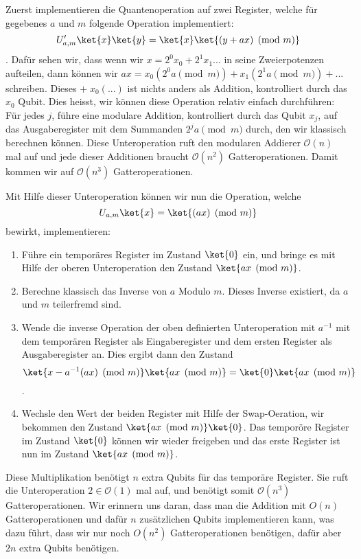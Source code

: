 Zuerst implementieren die Quantenoperation auf zwei Register, welche für gegebenes $a$ und $m$ folgende Operation implementiert: $$U'_{a, m}\ket{x}\ket{y} = \ket{x}\ket{(y + ax) \pmod{m}}$$.
Dafür sehen wir, dass wenn wir $x = 2^0 x_0 + 2^1 x_1 ...$ in seine Zweierpotenzen aufteilen, dann können wir $ax = x_0(2^0 a \pmod{m}) + x_1(2^1 a \pmod{m}) + ...$ schreiben. Dieses $+ \;x_0(...)$ ist nichts anders als Addition, kontrolliert durch das $x_0$ Qubit. Dies heisst, wir können diese Operation relativ einfach durchführen: \newline
Für jedes $j$, führe eine modulare Addition, kontrolliert durch das Qubit $x_j$, auf das Ausgaberegister mit dem Summanden $2^ja \pmod{m}$ durch, den wir klassisch berechnen können. \newline
Diese Unteroperation ruft den modularen Addierer $\mathcal O(n)$ mal auf und jede dieser Additionen braucht $\mathcal O(n^2)$ Gatteroperationen. Damit kommen wir auf $\mathcal O(n^3)$ Gatteroperationen.

Mit Hilfe dieser Unteroperation können wir nun die Operation, welche $$U_{a, m}\ket{x} = \ket{(ax) \pmod{m}}$$ bewirkt, implementieren:
\begin{enumerate}
    \item Führe ein temporäres Register im Zustand $\ket{0}$ ein, und bringe es mit Hilfe der oberen Unteroperation den Zustand $\ket{ax \pmod{m}}$.
    \item Berechne klassisch das Inverse von $a$ Modulo $m$. Dieses Inverse existiert, da $a$ und $m$ teilerfremd sind.
    \item Wende die inverse Operation der oben definierten Unteroperation mit $a^{-1}$ mit dem temporären Register als Eingaberegister und dem ersten Register als Ausgaberegister an. Dies ergibt dann den Zustand $$\ket{x - a^{-1}(ax) \pmod{m}}\ket{ax \pmod{m}} = \ket{0}\ket{ax \pmod{m}}$$.
    \item Wechsle den Wert der beiden Register mit Hilfe der Swap-Oeration, wir bekommen den Zustand $\ket{ax \pmod{m}}\ket{0}$. Das temporöre Register im Zustand $\ket{0}$ können wir wieder freigeben und das erste Register ist nun im Zustand $\ket{ax \pmod{m}}$.
\end{enumerate}
Diese Multiplikation benötigt $n$ extra Qubits für das temporäre Register. Sie ruft die Unteroperation $2 \in \mathcal O(1)$ mal auf, und benötigt somit $\mathcal O(n^3)$ Gatteroperationen. Wir erinnern uns daran, dass man die Addition mit $O(n)$ Gatteroperationen und dafür $n$ zusätzlichen Qubits implementieren kann, was dazu führt, dass wir nur noch $O(n^2)$ Gatteroperationen benötigen, dafür aber $2n$ extra Qubits benötigen.